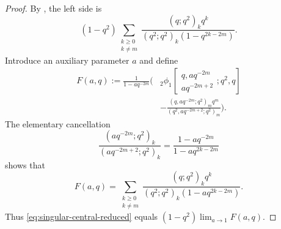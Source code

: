 \documentclass[11pt,a4paper,oneside,openany]{book}
\theoremstyle{definition}
\theoremstyle{remark}
\begin{document}
\begin{proof}
By , the left side is
\[
 (1-q^2)
 \sum_{\substack{k\ge0\\k\ne m}}
 \frac{(q;q^2)_kq^k}
 {(q^2;q^2)_k(1-q^{2k-2m})}.
 \tag{18.7}\label{eq:singular-central-reduced}
\]
Introduce an auxiliary parameter $a$ and define
\begin{equation}
\begin{aligned}
 F(a,q)
 :=\frac1{1-aq^{-2m}}\Bigg(&
 {}_2\phi_1\!\left[
 \begin{matrix}q,aq^{-2m}\\aq^{-2m+2}\end{matrix};q^2,q\right]\\
 &-\frac{(q,aq^{-2m};q^2)_m q^m}
 {(q^2,aq^{-2m+2};q^2)_m}
 \Bigg).
\end{aligned}
 \tag{18.8}\label{eq:F-auxiliary}
\end{equation}
The elementary cancellation
\[
 \frac{(aq^{-2m};q^2)_k}
      {(aq^{-2m+2};q^2)_k}
 =\frac{1-aq^{-2m}}{1-aq^{2k-2m}}
\]
shows that
\[
 F(a,q)=
 \sum_{\substack{k\ge0\\k\ne m}}
 \frac{(q;q^2)_kq^k}
 {(q^2;q^2)_k(1-aq^{2k-2m})}.
 \tag{18.9}\label{eq:F-series}
\]
Thus \eqref{eq:singular-central-reduced} equals
$(1-q^2)\lim_{a\to1}F(a,q)$.


\end{proof}
\end{document}
